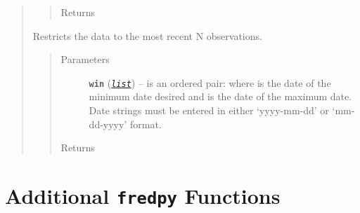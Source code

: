\documentclass[letterpaper,10pt,english]{sphinxmanual}
\begin{document}
\begin{fulllineitems}
\begin{quote}
\begin{fulllineitems}
\begin{quote}
\begin{description}
\item[{Returns}] \leavevmode
{\hyperref[series_class:fredpy.series]{}}

\end{description}\end{quote}

\end{fulllineitems}


\begin{fulllineitems}
\label{series_class:fredpy.series.window}
Restricts the data to the most recent N observations.
\begin{quote}\begin{description}
\item[{Parameters}] \leavevmode
\textbf{\texttt{win}} (\href{https://docs.python.org/2/library/functions.html\#list}{\emph{\texttt{list}}}) -- is an ordered pair:  where  is the date of the minimum date desired and  is the date of the maximum date. Date strings must be entered in either `yyyy-mm-dd' or `mm-dd-yyyy' format.

\item[{Returns}] \leavevmode
{\hyperref[series_class:fredpy.series]{}}

\end{description}\end{quote}

\end{fulllineitems}

\end{quote}

\end{fulllineitems}



\chapter{Additional \texttt{fredpy} Functions}
\label{additional_functions:additional-fredpy-functions}\label{additional_functions::doc}
\end{document}
